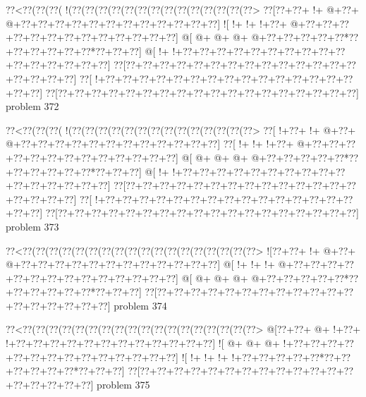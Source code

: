 \vbox{\vbox{\goo
\0??<\0??(\0??(\0??(\- !(\0??(\0??(\0??(\0??(\0??(\0??(\0??(\0??(\0??(\0??(\0??(\0??(\0??(\0??>
\0??[\0??+\0??+\- !+\- @+\0??+\- @+\0??+\0??+\0??+\0??+\0??+\0??+\0??+\0??+\0??+\0??+\0??+\0??]
\- ![\- !+\- !+\- !+\0??+\- @+\0??+\0??+\0??+\0??+\0??+\0??+\0??+\0??+\0??+\0??+\0??+\0??+\0??]
\- @[\- @+\- @+\- @+\- @+\0??+\0??+\0??+\0??+\0??*\0??+\0??+\0??+\0??+\0??+\0??*\0??+\0??+\0??]
\- @[\- !+\- !+\0??+\0??+\0??+\0??+\0??+\0??+\0??+\0??+\0??+\0??+\0??+\0??+\0??+\0??+\0??+\0??]
\0??[\0??+\0??+\0??+\0??+\0??+\0??+\0??+\0??+\0??+\0??+\0??+\0??+\0??+\0??+\0??+\0??+\0??+\0??]
\0??[\- !+\0??+\0??+\0??+\0??+\0??+\0??+\0??+\0??+\0??+\0??+\0??+\0??+\0??+\0??+\0??+\0??+\0??]
\0??[\0??+\0??+\0??+\0??+\0??+\0??+\0??+\0??+\0??+\0??+\0??+\0??+\0??+\0??+\0??+\0??+\0??+\0??]
}
\hfil problem 372\hfil\break
}



\vbox{\vbox{\goo
\0??<\0??(\0??(\0??(\- !(\0??(\0??(\0??(\0??(\0??(\0??(\0??(\0??(\0??(\0??(\0??(\0??(\0??(\0??>
\0??[\- !+\0??+\- !+\- @+\0??+\- @+\0??+\0??+\0??+\0??+\0??+\0??+\0??+\0??+\0??+\0??+\0??+\0??]
\0??[\- !+\- !+\- !+\0??+\- @+\0??+\0??+\0??+\0??+\0??+\0??+\0??+\0??+\0??+\0??+\0??+\0??+\0??]
\- @[\- @+\- @+\- @+\- @+\0??+\0??+\0??+\0??+\0??*\0??+\0??+\0??+\0??+\0??+\0??*\0??+\0??+\0??]
\- @[\- !+\- !+\0??+\0??+\0??+\0??+\0??+\0??+\0??+\0??+\0??+\0??+\0??+\0??+\0??+\0??+\0??+\0??]
\0??[\0??+\0??+\0??+\0??+\0??+\0??+\0??+\0??+\0??+\0??+\0??+\0??+\0??+\0??+\0??+\0??+\0??+\0??]
\0??[\- !+\0??+\0??+\0??+\0??+\0??+\0??+\0??+\0??+\0??+\0??+\0??+\0??+\0??+\0??+\0??+\0??+\0??]
\0??[\0??+\0??+\0??+\0??+\0??+\0??+\0??+\0??+\0??+\0??+\0??+\0??+\0??+\0??+\0??+\0??+\0??+\0??]
}
\hfil problem 373\hfil\break
}



\vbox{\vbox{\goo
\0??<\0??(\0??(\0??(\0??(\0??(\0??(\0??(\0??(\0??(\0??(\0??(\0??(\0??(\0??(\0??(\0??(\0??(\0??>
\- ![\0??+\0??+\- !+\- @+\0??+\- @+\0??+\0??+\0??+\0??+\0??+\0??+\0??+\0??+\0??+\0??+\0??+\0??]
\- @[\- !+\- !+\- !+\- @+\0??+\0??+\0??+\0??+\0??+\0??+\0??+\0??+\0??+\0??+\0??+\0??+\0??+\0??]
\- @[\- @+\- @+\- @+\- @+\0??+\0??+\0??+\0??+\0??*\0??+\0??+\0??+\0??+\0??+\0??*\0??+\0??+\0??]
\0??[\0??+\0??+\0??+\0??+\0??+\0??+\0??+\0??+\0??+\0??+\0??+\0??+\0??+\0??+\0??+\0??+\0??+\0??]
}
\hfil problem 374\hfil\break
}



\vbox{\vbox{\goo
\0??<\0??(\0??(\0??(\0??(\0??(\0??(\0??(\0??(\0??(\0??(\0??(\0??(\0??(\0??(\0??(\0??(\0??(\0??>
\- @[\0??+\0??+\- @+\- !+\0??+\- !+\0??+\0??+\0??+\0??+\0??+\0??+\0??+\0??+\0??+\0??+\0??+\0??]
\- ![\- @+\- @+\- @+\- !+\0??+\0??+\0??+\0??+\0??+\0??+\0??+\0??+\0??+\0??+\0??+\0??+\0??+\0??]
\- ![\- !+\- !+\- !+\- !+\0??+\0??+\0??+\0??+\0??*\0??+\0??+\0??+\0??+\0??+\0??*\0??+\0??+\0??]
\0??[\0??+\0??+\0??+\0??+\0??+\0??+\0??+\0??+\0??+\0??+\0??+\0??+\0??+\0??+\0??+\0??+\0??+\0??]
}
\hfil problem 375\hfil\break
}



